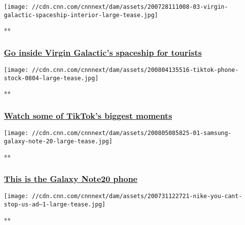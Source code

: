 \texttt{[image: //cdn.cnn.com/cnnnext/dam/assets/200728111008-03-virgin-galactic-spaceship-interior-large-tease.jpg]}

**

\hypertarget{go-inside-virgin-galactics-spaceship-for-tourists}{%
\subsubsection{\texorpdfstring{\href{/videos/business/2020/07/28/virgin-galactic-cabin-spaceship-vr-orig-bl.cnn}{Go
inside Virgin Galactic's spaceship for
tourists}}{Go inside Virgin Galactic's spaceship for tourists}}\label{go-inside-virgin-galactics-spaceship-for-tourists}}

\href{/videos/business/2020/08/04/tiktok-biggest-trends-orig.cnn-business}{}

\texttt{[image: //cdn.cnn.com/cnnnext/dam/assets/200804135516-tiktok-phone-stock-0804-large-tease.jpg]}

**

\hypertarget{watch-some-of-tiktoks-biggest-moments}{%
\subsubsection{\texorpdfstring{\href{/videos/business/2020/08/04/tiktok-biggest-trends-orig.cnn-business}{Watch
some of TikTok's biggest
moments}}{Watch some of TikTok's biggest moments}}\label{watch-some-of-tiktoks-biggest-moments}}

\href{/videos/business/2020/08/05/samsung-galaxy-note20-orig.cnn-business}{}

\texttt{[image: //cdn.cnn.com/cnnnext/dam/assets/200805085825-01-samsung-galaxy-note-20-large-tease.jpg]}

**

\hypertarget{this-is-the-galaxy-note20-phone}{%
\subsubsection{\texorpdfstring{\href{/videos/business/2020/08/05/samsung-galaxy-note20-orig.cnn-business}{This
is the Galaxy Note20
phone}}{This is the Galaxy Note20 phone}}\label{this-is-the-galaxy-note20-phone}}

\href{/videos/business/2020/07/31/nike-you-cant-stop-us-ad-orig.cnn-business}{}

\texttt{[image: //cdn.cnn.com/cnnnext/dam/assets/200731122721-nike-you-cant-stop-us-ad---1-large-tease.jpg]}

**

